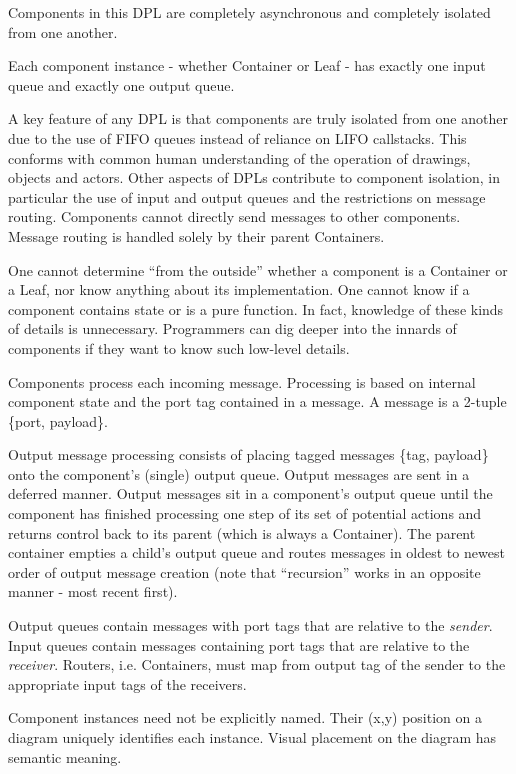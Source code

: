 \documentclass[10pt,anonymous,review]{acmart}
\begin{document}
Components in this DPL are completely asynchronous and completely isolated from one another. 

Each component instance - whether Container or Leaf - has exactly one input queue and exactly one output queue.

A key feature of any DPL is that components are truly isolated from one another due to the use of FIFO queues instead of reliance on LIFO callstacks. This conforms with common human understanding of the operation of drawings, objects and actors. Other aspects of DPLs contribute to component isolation, in particular the use of input and output queues and the restrictions on message routing. Components cannot directly send messages to other components. Message routing is handled solely by their parent Containers.

One cannot determine “from the outside” whether a component is a Container or a Leaf, nor know anything about its implementation. One cannot know if a component contains state or is a pure function. In fact, knowledge of these kinds of details is unnecessary. Programmers can dig deeper into the innards of components if they want to know such low-level details.

Components process each incoming message. Processing is based on internal component state and the port tag contained in a message. A message is a 2-tuple \{port, payload\}.

Output message processing consists of placing tagged messages \{tag, payload\} onto the component’s (single) output queue. Output messages are sent in a deferred manner. Output messages sit in a component’s output queue until the component has finished processing one step of its set of potential actions and returns control back to its parent (which is always a Container). The parent container empties a child’s output queue and routes messages in oldest to newest order of output message creation (note that “recursion” works in an opposite manner - most recent first).

Output queues contain messages with port tags that are relative to the \emph{sender}. Input queues contain messages containing port tags that are relative to the \emph{receiver}. Routers, i.e. Containers, must map from output tag of the sender to the appropriate input tags of the receivers.

Component instances need not be explicitly named. Their (x,y) position on a diagram uniquely identifies each instance. Visual placement on the diagram has semantic meaning.
\end{document}
